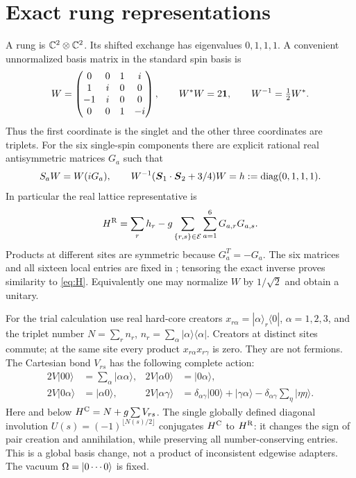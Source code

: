 \section{Exact rung representations}\label{sec:rung}
A rung is $\mathbb C^2\otimes\mathbb C^2$. Its shifted exchange has eigenvalues $0,1,1,1$.
A convenient unnormalized basis matrix in the standard spin basis is
\[
 W=\begin{pmatrix}
 0&0&1&i\\1&i&0&0\\-1&i&0&0\\0&0&1&-i
 \end{pmatrix},\qquad W^*W=2\mathbf 1,\qquad W^{-1}=\tfrac12W^*.
\]
Thus the first coordinate is the singlet and the other three coordinates are
triplets. For the six single-spin components there are explicit rational real
antisymmetric matrices $G_a$ such that
\begin{equation}\label{eq:magic}
 S_a W=W(iG_a),\qquad
 W^{-1}(\boldsymbol S_1\cdot\boldsymbol S_2+3/4)W
   =h:=\operatorname{diag}(0,1,1,1).
\end{equation}
In particular the real lattice representative is
\begin{equation}\label{eq:realH}
 H^{\rm R}=\sum_rh_r-g\sum_{\{r,s\}\in\mathcal E}\sum_{a=1}^6G_{a,r}G_{a,s}.
\end{equation}
Products at different sites are symmetric because $G_a^T=-G_a$.
The six matrices and all sixteen local entries are fixed in
; tensoring the exact inverse proves similarity to
\eqref{eq:H}. Equivalently one may normalize $W$ by $1/\sqrt2$ and obtain a unitary.

For the trial calculation use real hard-core creators
$x_{r\alpha}=|\alpha\rangle_r\langle0|$, $\alpha=1,2,3$, and the triplet number
$N=\sum_r n_r$, $n_r=\sum_\alpha|\alpha\rangle\langle\alpha|$.
Creators at distinct sites commute; at the same site every product
$x_{r\alpha}x_{r\gamma}$ is zero. They are not fermions.
The Cartesian bond $V_{rs}$ has the following complete action:
\begin{align}\label{eq:bondaction}
 2V|00\rangle&=\sum_\alpha|\alpha\alpha\rangle,&
 2V|\alpha0\rangle&=|0\alpha\rangle,\\
 2V|0\alpha\rangle&=|\alpha0\rangle,&
 2V|\alpha\gamma\rangle&=\delta_{\alpha\gamma}|00\rangle
   +|\gamma\alpha\rangle-\delta_{\alpha\gamma}\sum_\eta|\eta\eta\rangle.
\end{align}
Here and below $H^{\rm C}=N+g\sum V_{rs}$.
The single globally defined diagonal involution
$U(s)=(-1)^{\lfloor N(s)/2\rfloor}$ conjugates $H^{\rm C}$ to $H^{\rm R}$:
it changes the sign of pair creation and annihilation, while preserving all
number-conserving entries. This is a global basis change, not a product of
inconsistent edgewise adapters. The vacuum $\Omega=|0\cdots0\rangle$ is fixed.
